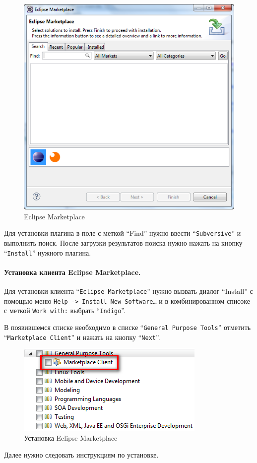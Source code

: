\documentclass[a4paper,12pt]{article}
\begin{document}
\begin{figure}[h!]
	\centering
	\includegraphics[scale=0.60]{eclipse-marketplace-instalation.png}
	\vspace{-10pt}
	\caption{Eclipse Marketplace}
\end{figure}

Для установки плагина в поле с меткой ``Find'' нужно ввести
``\texttt{Subversive}'' и выполнить поиск. После загрузки результатов поиска
нужно нажать на кнопку ``\texttt{Install}'' нужного плагина.

\paragraph{Установка клиента Eclipse Marketplace.}

Для установки клиента ``\texttt{Eclipse Marketplace}'' нужно вызвать диалог
``Install'' с помощью меню \texttt{Help -\textgreater{} Install New
Software\ldots} и в комбинированном списоке с меткой \texttt{Work with:} выбрать
``\texttt{Indigo}''.

В появившемся списке необходимо в списке ``\texttt{General Purpose Tools}''
отметить ``\texttt{Marketplace Client}'' и нажать на кнопку ``\texttt{Next}''.
\begin{figure}[h!]
	\centering
	\includegraphics[scale=0.70]{eclipse-marketplace-instalation-1.png}
	\vspace{-10pt}
	\caption{Установка Eclipse Marketplace}
\end{figure}
Далее нужно следовать инструкциям по установке.
\end{document}
